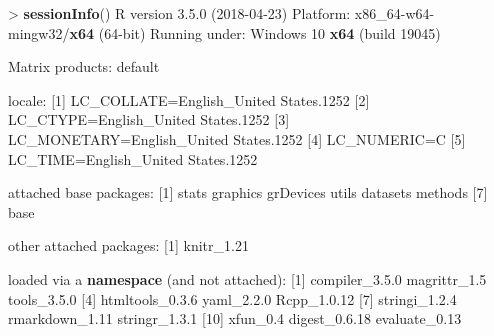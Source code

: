 \documentclass[]{article}
\newenvironment{Shaded}{\begin{snugshade}}{\end{snugshade}}
\newcommand{\KeywordTok}[1]{\textcolor[rgb]{0.13,0.29,0.53}{\textbf{{#1}}}}
\newcommand{\DecValTok}[1]{\textcolor[rgb]{0.00,0.00,0.81}{{#1}}}
\newcommand{\FloatTok}[1]{\textcolor[rgb]{0.00,0.00,0.81}{{#1}}}
\newcommand{\StringTok}[1]{\textcolor[rgb]{0.31,0.60,0.02}{{#1}}}
\newcommand{\NormalTok}[1]{{#1}}
\begin{document}
\begin{Shaded}
\begin{Highlighting}[]
\NormalTok{>}\StringTok{ }\KeywordTok{sessionInfo}\NormalTok{()}
\NormalTok{R version }\FloatTok{3.5.0} \NormalTok{(}\DecValTok{2018-04-23}\NormalTok{)}
\NormalTok{Platform:}\StringTok{ }\NormalTok{x86_64-w64-mingw32/}\KeywordTok{x64} \NormalTok{(}\DecValTok{64}\NormalTok{-bit)}
\NormalTok{Running under:}\StringTok{ }\NormalTok{Windows }\DecValTok{10} \KeywordTok{x64} \NormalTok{(build }\DecValTok{19045}\NormalTok{)}

\NormalTok{Matrix products:}\StringTok{ }\NormalTok{default}

\NormalTok{locale:}
\NormalTok{[}\DecValTok{1}\NormalTok{] LC_COLLATE=English_United States}\FloatTok{.1252} 
\NormalTok{[}\DecValTok{2}\NormalTok{] LC_CTYPE=English_United States}\FloatTok{.1252}   
\NormalTok{[}\DecValTok{3}\NormalTok{] LC_MONETARY=English_United States}\FloatTok{.1252}
\NormalTok{[}\DecValTok{4}\NormalTok{] LC_NUMERIC=C                          }
\NormalTok{[}\DecValTok{5}\NormalTok{] LC_TIME=English_United States}\FloatTok{.1252}    

\NormalTok{attached base packages:}
\NormalTok{[}\DecValTok{1}\NormalTok{] stats     graphics  grDevices utils     datasets  methods  }
\NormalTok{[}\DecValTok{7}\NormalTok{] base     }

\NormalTok{other attached packages:}
\NormalTok{[}\DecValTok{1}\NormalTok{] knitr_1}\FloatTok{.21}

\NormalTok{loaded via a }\KeywordTok{namespace} \NormalTok{(and not attached):}
\StringTok{ }\NormalTok{[}\DecValTok{1}\NormalTok{] compiler_3}\FloatTok{.5.0}  \NormalTok{magrittr_1}\FloatTok{.5}    \NormalTok{tools_3}\FloatTok{.5.0}    
 \NormalTok{[}\DecValTok{4}\NormalTok{] htmltools_0}\FloatTok{.3.6} \NormalTok{yaml_2}\FloatTok{.2.0}      \NormalTok{Rcpp_1}\FloatTok{.0.12}    
 \NormalTok{[}\DecValTok{7}\NormalTok{] stringi_1}\FloatTok{.2.4}   \NormalTok{rmarkdown_1}\FloatTok{.11}  \NormalTok{stringr_1}\FloatTok{.3.1}  
\NormalTok{[}\DecValTok{10}\NormalTok{] xfun_0}\FloatTok{.4}        \NormalTok{digest_0}\FloatTok{.6.18}   \NormalTok{evaluate_0}\FloatTok{.13}  
\end{Highlighting}
\end{Shaded}
\end{document}
